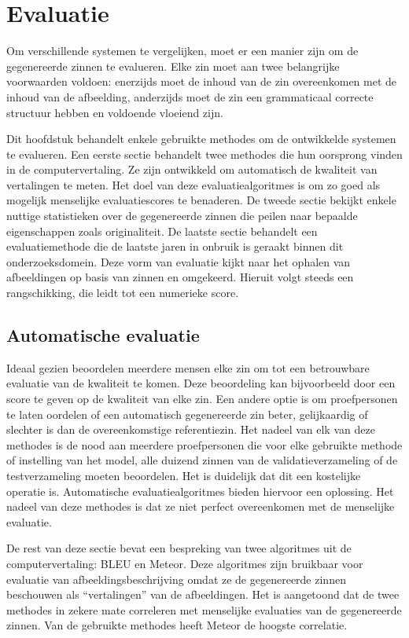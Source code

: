 \chapter{Evaluatie}
\label{hoofdstuk:evaluatie}
Om verschillende systemen te vergelijken, moet er een manier zijn om de gegenereerde zinnen te evalueren. Elke zin moet aan twee belangrijke voorwaarden voldoen: enerzijds moet de inhoud van de zin overeenkomen met de inhoud van de afbeelding, anderzijds moet de zin een grammaticaal correcte structuur hebben en voldoende vloeiend zijn.

Dit hoofdstuk behandelt enkele gebruikte methodes om de ontwikkelde systemen te evalueren. Een eerste sectie behandelt twee methodes die hun oorsprong vinden in de computervertaling. Ze zijn ontwikkeld om automatisch de kwaliteit van vertalingen te meten. Het doel van deze evaluatiealgoritmes is om zo goed als mogelijk menselijke evaluatiescores te benaderen. De tweede sectie bekijkt enkele nuttige statistieken over de gegenereerde zinnen die peilen naar bepaalde eigenschappen zoals originaliteit. De laatste sectie behandelt een evaluatiemethode die de laatste jaren in onbruik is geraakt binnen dit onderzoeksdomein. Deze vorm van evaluatie kijkt naar het ophalen van afbeeldingen op basis van zinnen en omgekeerd. Hieruit volgt steeds een rangschikking, die leidt tot een numerieke score.


\section{Automatische evaluatie}
Ideaal gezien beoordelen meerdere mensen elke zin om tot een betrouwbare evaluatie van de kwaliteit te komen. Deze beoordeling kan bijvoorbeeld door een score te geven op de kwaliteit van elke zin. Een andere optie is om proefpersonen te laten oordelen of een automatisch gegenereerde zin beter, gelijkaardig of slechter is dan de overeenkomstige referentiezin. Het nadeel van elk van deze methodes is de nood aan meerdere proefpersonen die voor elke gebruikte methode of instelling van het model, alle duizend zinnen van de validatieverzameling of de testverzameling moeten beoordelen. Het is duidelijk dat dit een kostelijke operatie is. Automatische evaluatiealgoritmes bieden hiervoor een oplossing. Het nadeel van deze methodes is dat ze niet perfect overeenkomen met de menselijke evaluatie.

De rest van deze sectie bevat een bespreking van twee algoritmes uit de computervertaling: BLEU\cite{Papineni2001} en Meteor\cite{Denkowski2007a}. Deze algoritmes zijn bruikbaar voor evaluatie van afbeeldingsbeschrijving omdat ze de gegenereerde zinnen beschouwen als ``vertalingen'' van de afbeeldingen. Het is aangetoond dat de twee methodes in zekere mate correleren met menselijke evaluaties van de gegenereerde zinnen. Van de gebruikte methodes heeft Meteor de hoogste correlatie\cite{Elliott2014}.

